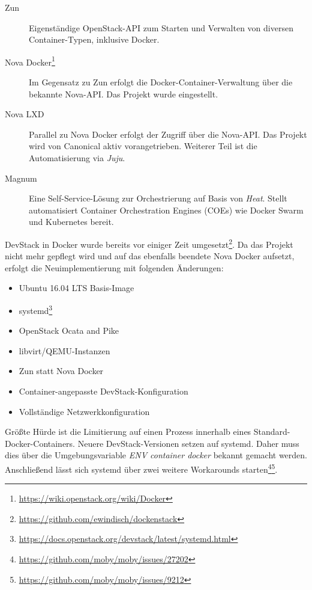 \begin{description}
	\item[Zun] Eigenständige OpenStack-API zum Starten und Verwalten von diversen Container-Typen, inklusive Docker.
	\item[Nova Docker\footnote{\url{https://wiki.openstack.org/wiki/Docker}}] Im Gegensatz zu Zun erfolgt die Docker-Container-Verwaltung über die bekannte Nova-API. Das Projekt wurde eingestellt.
	\item[Nova LXD] Parallel zu Nova Docker erfolgt der Zugriff über die Nova-API. Das Projekt wird von Canonical aktiv vorangetrieben. Weiterer Teil ist die Automatisierung via \emph{Juju}.
	\item[Magnum] Eine Self-Service-Lösung zur Orchestrierung auf Basis von \emph{Heat}. Stellt automatisiert Container Orchestration Engines (COEs) wie Docker Swarm und Kubernetes bereit.
\end{description}

\noindent DevStack in Docker wurde bereits vor einiger Zeit umgesetzt\footnote{\url{https://github.com/ewindisch/dockenstack}}. Da das Projekt nicht mehr gepflegt wird und auf das ebenfalls beendete Nova Docker aufsetzt, erfolgt die Neuimplementierung mit folgenden Änderungen:

\begin{itemize}
	
	\item Ubuntu 16.04 LTS Basis-Image
	\item systemd\footnote{\url{https://docs.openstack.org/devstack/latest/systemd.html}}
	\item OpenStack Ocata and Pike
	\item libvirt/QEMU-Instanzen
	\item Zun statt Nova Docker
	\item Container-angepasste DevStack-Konfiguration
	\item Vollständige Netzwerkkonfiguration
	
\end{itemize}


\noindent Größte Hürde ist die Limitierung auf einen Prozess innerhalb eines Standard-Docker-Containers. Neuere DevStack-Versionen setzen auf systemd. Daher muss dies über die Umgebungsvariable \emph{ENV container docker} bekannt gemacht werden. Anschließend lässt sich systemd über zwei weitere Workarounds starten\footnote{\url{https://github.com/moby/moby/issues/27202}}\footnote{\url{https://github.com/moby/moby/issues/9212}}.

